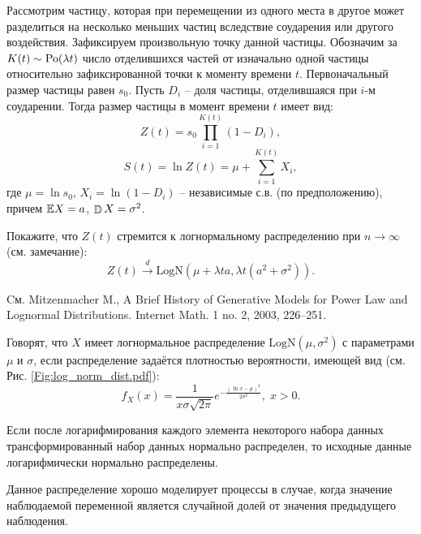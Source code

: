\begin{problem}
\label{lognorm}
Рассмотрим частицу, которая при перемещении из одного места
в другое может разделиться на несколько меньших частиц вследствие соударения или другого воздействия. Зафиксируем произвольную точку данной частицы.  Обозначим за $K(t) \sim \mathrm{Po}(\lambda t)$ число отделившихся частей от изначально одной частицы относительно зафиксированной точки к моменту времени $t$. Первоначальный размер частицы равен $s_0$. Пусть $D_i$  -- доля частицы, отделившаяся при $i$-м соударении. Тогда размер
частицы в момент времени $t$ имеет вид:
\[
Z(t) = s_0 \prod \limits_{i=1}^{K(t)} (1 - D_i),
\]
\[
S(t) = \ln Z(t) =  \mu +  \sum \limits_{i=1}^{K(t)} X_i,
\]
\noindent где $\mu = \ln s_0$, $X_i = \ln (1 - D_i)$ -- независимые с.в. (по предположению), причем $\mathrm{{\mathbb E}} X = a$, $\mathop{\mathbb{D}}\nolimits X = \sigma^2$. 

Покажите, что $Z(t)$ стремится к логнормальному распределению при $n\to\infty$ (см. замечание):
\[
Z(t) \xrightarrow{d} \mathrm{LogN} \left(\mu + \lambda t a, \lambda t (a^2 + \sigma^2) \right).
\] 
\end{problem}

\begin{remark}
Cм. Mitzenmacher M., A Brief History of Generative Models for Power Law and Lognormal Distributions. Internet Math. 1 no. 2, 2003, 226--251.

Говорят, что $X$  имеет логнормальное распределение $\mathrm{LogN}(\mu,  \sigma^2)$ с параметрами $\mu$ и $\sigma$, если распределение задаётся плотностью вероятности, имеющей вид (см. Рис. \ref{Fig:log_norm_dist.pdf}):
\[
f_X(x) = \frac{1}{x \sigma \sqrt{2 \pi}} e^{- \frac{(\ln x - \mu)^2}{2 \sigma^2}}, \; x > 0.
\]
\end{remark}

Если после логарифмирования каждого элемента некоторого набора данных трансформированный набор данных нормально распределен, то исходные данные логарифмически нормально распределены.

Данное распределение хорошо моделирует процессы в случае, когда значение наблюдаемой переменной является случайной долей от значения предыдущего наблюдения.





